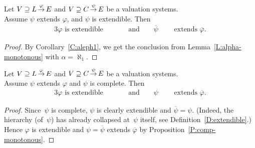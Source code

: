 \documentclass[main.tex]{subfiles}
\begin{document}
%
%
\begin{prop}
\label{P:comp-monotonous}
Let $V \supseteq L\,\smash{\stackrel{\varphi}{\rightarrow}}\,E$
and $V \supseteq C\,\smash{\stackrel{\psi}{\rightarrow}}\,E$
 be a valuation systems.\\
Assume 
$\psi$ extends $\varphi$,
and 
$\psi$ is extendible.
Then 
\begin{alignat*}{3}
\text{$\varphi$ is extendible}
\qquad&&\text{and}\qquad
\text{$\overline\psi$ }&&\text{extends $\overline\varphi$}.
\end{alignat*}
\end{prop}
\begin{proof}
By Corollary~\ref{C:aleph1},
we get the conclusion from
Lemma~\ref{L:alpha-monotonous}
with $\alpha=\aleph_1$.
\end{proof}
%
%
\begin{prop}
\label{P:comp-minimal}
Let $V \supseteq L\,\smash{\stackrel{\varphi}{\rightarrow}}\,E$
and $V \supseteq C\,\smash{\stackrel{\psi}{\rightarrow}}\,E$
 be a valuation systems.\\
Assume 
$\psi$ extends $\varphi$
and $\psi$ is complete.
Then 
\begin{alignat*}{3}
\text{$\varphi$ is extendible}
\qquad&&\text{and}\qquad
\text{$\psi$ }&&\text{extends $\overline\varphi$}.
\end{alignat*}
\end{prop}
\begin{proof}
Since~$\psi$ is complete,
$\psi$ is clearly extendible 
and $\overline\psi = \psi$.
(Indeed, the hierarchy (of~$\psi$) has already collapsed at~$\psi$ itself,
see Definition~\ref{D:extendible}.)
Hence $\varphi$ is extendible
and $\psi=\overline\psi$ extends $\overline\varphi$
by Proposition~\ref{P:comp-monotonous}.
\end{proof}
\end{document}
